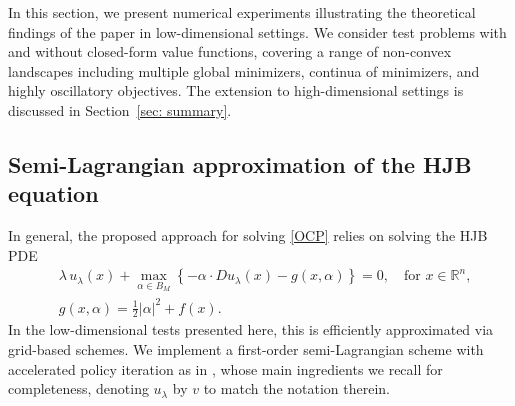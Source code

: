 \documentclass[12pt]{amsart}
\numberwithin{equation}{section}
\theoremstyle{plain}
\begin{document}
In this section, we present numerical experiments illustrating the theoretical findings of the paper in low-dimensional settings. We consider test problems with and without closed-form value functions, covering a range of non-convex landscapes including multiple global minimizers, continua of minimizers, and highly oscillatory objectives. The extension to high-dimensional settings is discussed in Section~\ref{sec: summary}.

\subsection{Semi-Lagrangian approximation of the HJB equation}

In general, the proposed approach for solving \eqref{OCP} relies on solving the HJB PDE
\begin{equation}\label{HJB with Ham}
	\begin{aligned}
		& \lambda\,u_{\lambda}(x) + \max\limits_{\alpha\in B_{M}}\left\{-\alpha\cdot Du_{\lambda}(x) - g(x,\alpha)\right\} = 0, \quad \text{for } x\in \mathbb{R}^{n}, \\
		& g(x,\alpha) = \frac{1}{2}|\alpha|^{2} + f(x).
	\end{aligned}
\end{equation}
In the low-dimensional tests presented here, this is efficiently approximated via grid-based schemes. We implement a first-order semi-Lagrangian scheme with accelerated policy iteration as in \cite{alla2015efficient}, whose main ingredients we recall for completeness, denoting $u_\lambda$ by $v$ to match the notation therein.
\end{document}
